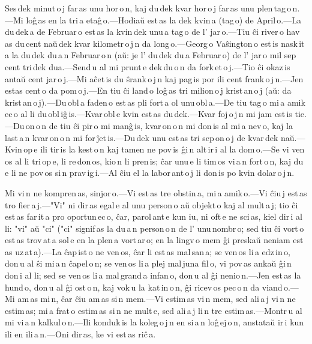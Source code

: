 \documentclass[ngerman,12pt,twoside]{book}
\begin{document}
Ses\,dek minut\,o\,j far\,as unu hor\,o\,n, kaj du\,dek kvar hor\,o\,j far\,as unu plen\,tag\,o\,n.---Mi loĝ\,as en la tri\,a etaĝ\,o.---Hodiaŭ est\,as la dek kvin\,a (tag\,o) de April\,o.---La du\,dek\,a de Februar\,o est\,as la kvin\,dek unu\,a tag\,o de l' jar\,o.---Tiu ĉi river\,o hav\,as du\,cent naŭ\,dek kvar kilometr\,o\,j\,n da long\,o.---Georg\,o Vaŝington\,o est\,is nask\,it\,a la du\,dek du\,a\,n Februar\,o\,n (aŭ: je l' du\,dek du\,a Februar\,o) de l' jar\,o mil sep\,cent tri\,dek dua.---Send\,u al mi prunt\,e dek\,du\,o\,n da fork\,et\,o\,j.---Tio ĉi okaz\,is antaŭ cent jar\,o\,j.---Mi aĉet\,is du ŝrank\,o\,j\,n kaj pag\,is por ili cent frank\,o\,j\,n.---Jen estas cent\,o da pom\,o\,j.---En tiu ĉi land\,o loĝ\,as tri milion\,o\,j krist\,an\,o\,j (aŭ: da krist\,an\,o\,j).---Du\,obl\,a faden\,o est\,as pli fort\,a ol unu\,obl\,a.---De tiu tag\,o mi\,a amik\,ec\,o al li du\,obl\,iĝ\,is.---Kvar\,obl\,e kvin est\,as du\,dek.---Kvar foj\,o\,j\,n mi jam est\,is tie.---Du\,on\,o\,n de tiu ĉi pir\,o mi manĝ\,is, kvar\,on\,o\,n mi don\,is al mi\,a nev\,o, kaj la last\,a\,n kvar\,on\,o\,n mi for\,ĵet\,is.---Du\,dek unu est\,as tri sep\,on\,o\,j de kvar\,dek naŭ.---Kvin\,op\,e ili tir\,is la kest\,o\,n kaj tamen ne pov\,is ĝi\,n alt\,ir\,i al la dom\,o.---Se vi ven\,os al li tri\,op\,e, li re\,don\,os, kio\,n li pren\,is; ĉar unu\,e li tim\,os vi\,a\,n fort\,o\,n, kaj du\,e li ne pov\,os si\,n prav\,ig\,i.---Al ĉiu el la labor\,ant\,o\,j li don\,is po kvin dolar\,o\,j\,n. 



Mi vi\,n ne kompren\,as, sinjor\,o.---Vi est\,as tre obstin\,a, mi\,a amik\,o.---Vi ĉiu\,j est\,as tro fier\,a\,j.---"Vi" ni dir\,as egal\,e al unu person\,o aŭ objekt\,o kaj al mult\,a\,j; tio ĉi est\,as far\,it\,a pro oportun\,ec\,o, ĉar, parol\,ant\,e kun iu, ni oft\,e ne sci\,as, kiel dir\,i al li: "vi" aŭ "ci" ("ci" signif\,as la du\,a\,n person\,o\,n de l' unu\,nombr\,o; sed tiu ĉi vort\,o est\,as trov\,at\,a sol\,e en la plen\,a vort\,ar\,o; en la lingv\,o mem ĝi preskaŭ neniam est\,as uz\,at\,a).---La ĉap\,ist\,o ne ven\,os, ĉar li est\,as mal\,san\,a; se ven\,os li\,a edz\,in\,o, don\,u al ŝi mi\,a\,n ĉapel\,o\,n; se ven\,os li\,a plej mal\,juna fil\,o, vi pov\,as ankaŭ ĝi\,n don\,i al li; sed se ven\,os li\,a mal\,grand\,a infan\,o, don\,u al ĝi nenio\,n.---Jen est\,as la hund\,o, don\,u al ĝi ost\,o\,n, kaj vok\,u la kat\,in\,o\,n, ĝi ricev\,os pec\,o\,n da viand\,o.---Mi am\,as mi\,n, ĉar ĉiu am\,as si\,n mem.---Vi estim\,as vi\,n mem, sed ali\,a\,j vi\,n ne estim\,as; mi\,a frat\,o estim\,as si\,n ne mult\,e, sed ali\,a\,j li\,n tre estim\,as.---Montr\,u al mi vi\,a\,n kalkul\,o\,n.---Ili konduk\,is la koleg\,o\,j\,n en si\,a\,n loĝ\,ej\,o\,n, anstataŭ ir\,i kun ili en ili\,a\,n.---Oni dir\,as, ke vi est\,as riĉ\,a. 
\end{document}
